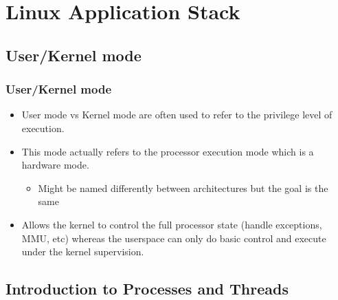 \section{Linux Application Stack}

\subsection{User/Kernel mode}

\begin{frame}
  \frametitle{User/Kernel mode}
  \begin{itemize}
    \item User mode vs Kernel mode are often used to refer to the privilege
          level of execution.
    \item This mode actually refers to the processor execution mode which is a
          hardware mode.
    \begin{itemize}
      \item Might be named differently between architectures but the goal is
            the same
    \end{itemize}
    \item Allows the kernel to control the full processor state (handle
      exceptions, MMU, etc) whereas the userspace can only do basic control
          and execute under the kernel supervision.
  \end{itemize}
\end{frame}

\subsection{Introduction to Processes and Threads}

